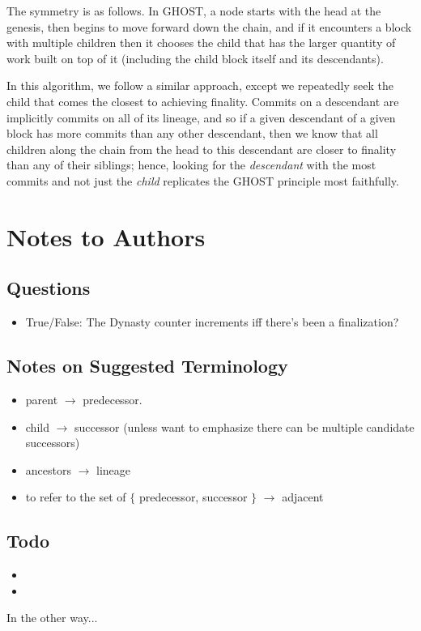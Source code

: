 The symmetry is as follows. In GHOST, a node starts with the head at the genesis, then begins to move forward down the chain, and if it encounters a block with multiple children then it chooses the child that has the larger quantity of work built on top of it (including the child block itself and its descendants).

In this algorithm, we follow a similar approach, except we repeatedly seek the child that comes the closest to achieving finality. Commits on a descendant are implicitly commits on all of its lineage, and so if a given descendant of a given block has more commits than any other descendant, then we know that all children along the chain from the head to this descendant are closer to finality than any of their siblings; hence, looking for the \textit{descendant} with the most commits and not just the \textit{child} replicates the GHOST principle most faithfully. 

\section{Notes to Authors}
\subsection{Questions}
\begin{itemize}
\item True/False: The Dynasty counter increments iff there's been a finalization?
\end{itemize}


\subsection{Notes on Suggested Terminology}
\begin{itemize}
\item parent $\rightarrow$ predecessor.
\item child $\rightarrow$ successor (unless want to emphasize there can be multiple candidate successors)
\item ancestors $\rightarrow$ lineage
\item to refer to the set of $\{$ predecessor, successor $\}$ $\rightarrow$ adjacent
\end{itemize}


\subsection{Todo}
\begin{itemize}
\item {}
\item {}
\end{itemize}


In the other way...

